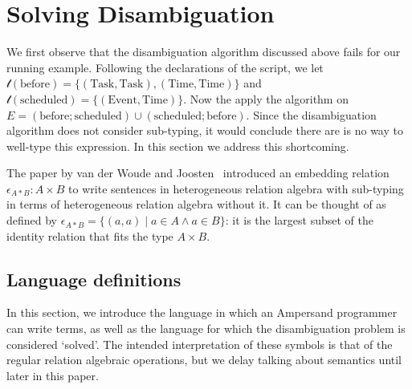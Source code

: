 \documentclass[12pt]{article}
\begin{document}
\section{Solving Disambiguation}
We first observe that the disambiguation algorithm discussed above fails for our running example.
Following the declarations of the script, we let $\mathcal{t}(\mathrm{before}) = \{(\mathrm{Task}, \mathrm{Task}),(\mathrm{Time}, \mathrm{Time})\}$ and $\mathcal{t}(\mathrm{scheduled}) = \{(\mathrm{Event}, \mathrm{Time})\}$.
Now the apply the algorithm on $E = (\mathrm{before};\mathrm{scheduled}) \cup (\mathrm{scheduled};\mathrm{before})$.
Since the disambiguation algorithm does not consider sub-typing, it would conclude there are is no way to well-type this expression.
In this section we address this shortcoming.

The paper by van der Woude and Joosten~\cite{Woude11} introduced an embedding relation $\epsilon_{A*B} : A \times B$ to write sentences in heterogeneous relation algebra with sub-typing in terms of heterogeneous relation algebra without it.
It can be thought of as defined by $\epsilon_{A*B} = \{(a,a) \mid a\in A \wedge a\in B\}$: it is the largest subset of the identity relation that fits the type $A\times B$.


\subsection{Language definitions}
In this section, we introduce the language in which an Ampersand programmer can write terms, as well as the language for which the disambiguation problem is considered `solved'.
The intended interpretation of these symbols is that of the regular relation algebraic operations, but we delay talking about semantics until later in this paper.
\end{document}
